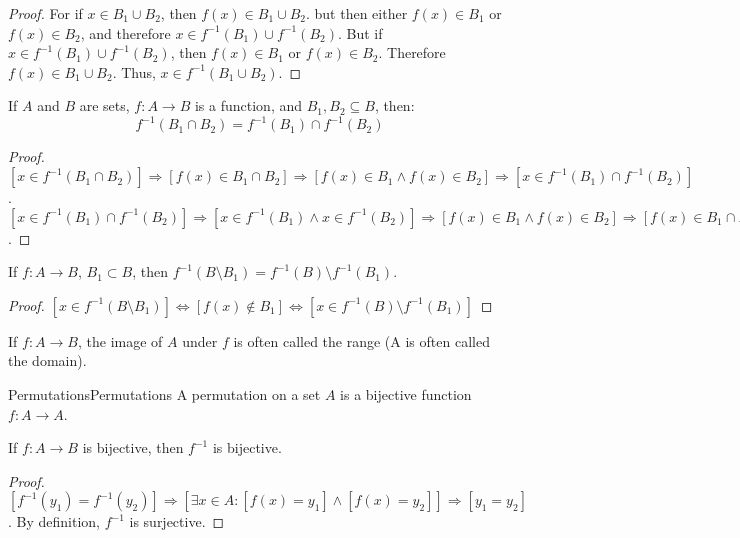     \begin{proof}
        For if $x\in{B}_{1}\cup{B}_{2}$, then
        $f(x)\in{B}_{1}\cup{B}_{2}$. but then either
        $f(x)\in{B}_{1}$ or $f(x)\in{B}_{2}$, and therefore
        $x\in{f}^{\minus{1}}(B_1)\cup{f}^{\minus{1}}(B_2)$. But if
        $x\in{f}^{\minus{1}}(B_{1})\cup{f}^{\minus{1}}(B_2)$, then
        $f(x)\in{B}_{1}$ or $f(x)\in{B}_{2}$. Therefore
        $f(x)\in{B}_{1}\cup{B}_{2}$. Thus, $x\in{f}^{-1}(B_1\cup{B}_2)$.
    \end{proof}
    \begin{theorem}
        If $A$ and $B$ are sets, $f:A\rightarrow{B}$ is a function,
        and $B_{1},B_{2}\subseteq{B}$, then:
        \begin{equation}
            f^{-1}(B_{1}\cap{B}_{2})=f^{-1}(B_{1})\cap{f}^{-1}(B_{2})
        \end{equation}
    \end{theorem}
    \begin{proof}
        $[x\in f^{-1}(B_1\cap B_2)]\Rightarrow [f(x) \in B_1 \cap B_2]\Rightarrow [f(x)\in B_1\land f(x) \in B_2 ]\Rightarrow [x\in f^{-1}(B_1)\cap f^{-1}(B_2)]$. $[x\in f^{-1}(B_1)\cap f^{-1}(B_2)]\Rightarrow [x\in f^{-1}(B_1)\land x\in f^{-1}(B_2)]\Rightarrow [f(x) \in B_1\land f(x) \in B_2]\Rightarrow [f(x)\in B_1\cap B_2]\Rightarrow [x\in f^{-1}(B_1\cap B_2)]$.
    \end{proof}
    \begin{theorem}
    If $f:A\rightarrow B$, $B_1 \subset B$, then $f^{-1}(B\setminus B_1) = f^{-1}(B)\setminus f^{-1}(B_1)$.
    \end{theorem}
    \begin{proof}
    $[x\in f^{-1}(B\setminus B_1)]\Leftrightarrow [f(x)\notin B_1]\Leftrightarrow [x\in f^{-1}(B)\setminus f^{-1}(B_1)]$
    \end{proof}
    If $f:A\rightarrow B$, the image of $A$ under $f$
    is often called the range (A is often called the domain).
    \begin{ldefinition}{Permutations}{Permutations}
        A permutation on a set $A$ is a bijective function
        $f:A\rightarrow{A}$.
    \end{ldefinition}
    \begin{theorem}
    If $f:A\rightarrow B$ is bijective, then $f^{-1}$ is bijective.
    \end{theorem}
    \begin{proof}
    $[f^{-1}(y_1) = f^{-1}(y_2)]\Rightarrow [\exists x\in A:[f(x) = y_1]\land [f(x)=y_2]]\Rightarrow [y_1=y_2]$. By definition, $f^{-1}$ is surjective.
    \end{proof}
